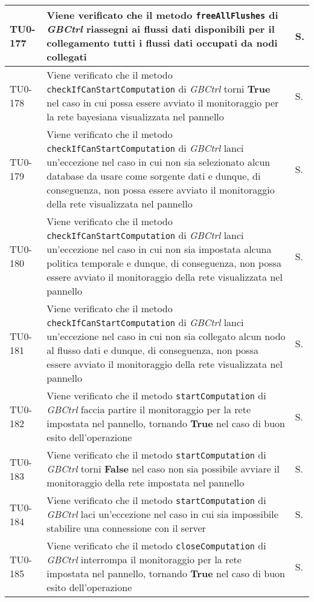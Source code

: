 \begin{longtable}{|C{.15\textwidth}|m{.66\textwidth}|C{.10\textwidth}|}
\hline
{}TU0-177 & Viene verificato che il metodo \texttt{freeAllFlushes} di \textit{GBCtrl} riassegni ai flussi dati disponibili per il collegamento tutti i flussi dati occupati da nodi collegati & S.\\
\hline
TU0-178 & Viene verificato che il metodo \texttt{checkIfCanStartComputation} di \textit{GBCtrl} torni \textbf{True} nel caso in cui possa essere avviato il monitoraggio per la rete bayesiana visualizzata nel pannello & S.\\
\hline
{}TU0-179 & Viene verificato che il metodo \texttt{checkIfCanStartComputation} di \textit{GBCtrl} lanci un'eccezione nel caso in cui non sia selezionato alcun database da usare come sorgente dati e dunque, di conseguenza, non possa essere avviato il monitoraggio della rete visualizzata nel pannello & S.\\
\hline
TU0-180 & Viene verificato che il metodo \texttt{checkIfCanStartComputation} di \textit{GBCtrl} lanci un'eccezione nel caso in cui non sia impostata alcuna politica temporale e dunque, di conseguenza, non possa essere avviato il monitoraggio della rete visualizzata nel pannello & S.\\
\hline
{}TU0-181 & Viene verificato che il metodo \texttt{checkIfCanStartComputation} di \textit{GBCtrl} lanci un'eccezione nel caso in cui non sia collegato alcun nodo al flusso dati e dunque, di conseguenza, non possa essere avviato il monitoraggio della rete visualizzata nel pannello & S.\\
\hline
TU0-182 & Viene verificato che il metodo \texttt{startComputation} di \textit{GBCtrl} faccia partire il monitoraggio per la rete impostata nel pannello, tornando \textbf{True} nel caso di buon esito dell'operazione & S.\\
\hline
{}TU0-183 & Viene verificato che il metodo \texttt{startComputation} di \textit{GBCtrl} torni \textbf{False} nel caso non sia possibile avviare il monitoraggio della rete impostata nel pannello & S.\\
\hline
TU0-184 & Viene verificato che il metodo \texttt{startComputation} di \textit{GBCtrl} laci un'eccezione nel caso in cui sia impossibile stabilire una connessione con il server & S.\\
\hline
{}TU0-185 & Viene verificato che il metodo \texttt{closeComputation} di \textit{GBCtrl} interrompa il monitoraggio per la rete impostata nel pannello, tornando \textbf{True} nel caso di buon esito dell'operazione & S.\\

\end{longtable}

